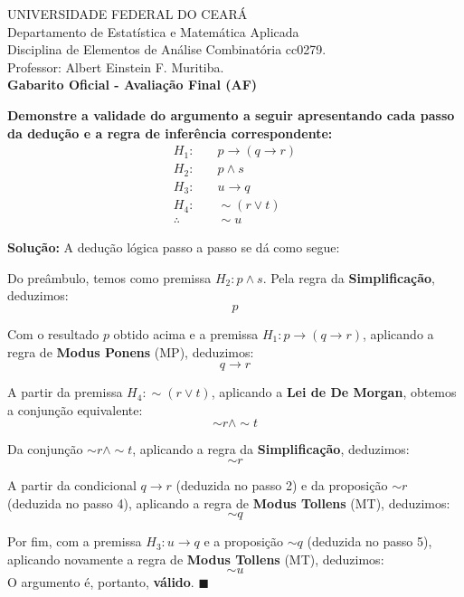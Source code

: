 \documentclass[a4paper,10pt,landscape,twocolumn]{article}  %
\let\oldenumerate\enumerate
\let\oldendenumerate\endenumerate
\renewenvironment{enumerate}{%
  \oldenumerate%
  \setlength{\itemsep}{1pt}%
  \setlength{\parskip}{0pt}%
  \setlength{\parsep}{0pt}%
  \setlength{\topsep}{2pt}%
  \setlength{\partopsep}{0pt}%
}{%
  \oldendenumerate%
}
\begin{document}
\footnotesize
\thispagestyle{empty}

UNIVERSIDADE FEDERAL DO CEARÁ\\
Departamento de Estatística e Matemática Aplicada\\
Disciplina de Elementos de Análise Combinatória cc0279.\\
Professor: Albert Einstein F. Muritiba.\\
\textbf{Gabarito Oficial - Avaliação Final (AF)} \\[0.2cm]

\begin{enumerate}
    
    \item \textbf{Demonstre a validade do argumento a seguir apresentando cada passo da dedução e a regra de inferência correspondente:}
    \begin{align*}
        H_1: & \quad p \rightarrow (q \rightarrow r) \\
        H_2: & \quad p \land s \\
        H_3: & \quad u \rightarrow q \\
        H_4: & \quad \sim(r \lor t) \\
        \hline
        \therefore & \quad \sim u
    \end{align*}
    
    \textbf{Solução:}
    A dedução lógica passo a passo se dá como segue:
    \begin{enumerate}
        \item Do preâmbulo, temos como premissa $H_2: p \land s$. Pela regra da \textbf{Simplificação}, deduzimos:
        \[ p \]
        \item Com o resultado $p$ obtido acima e a premissa $H_1: p \rightarrow (q \rightarrow r)$, aplicando a regra de \textbf{Modus Ponens} (MP), deduzimos:
        \[ q \rightarrow r \]
        \item A partir da premissa $H_4: \sim(r \lor t)$, aplicando a \textbf{Lei de De Morgan}, obtemos a conjunção equivalente:
        \[ \sim r \land \sim t \]
        \item Da conjunção $\sim r \land \sim t$, aplicando a regra da \textbf{Simplificação}, deduzimos:
        \[ \sim r \]
        \item A partir da condicional $q \rightarrow r$ (deduzida no passo 2) e da proposição $\sim r$ (deduzida no passo 4), aplicando a regra de \textbf{Modus Tollens} (MT), deduzimos:
        \[ \sim q \]
        \item Por fim, com a premissa $H_3: u \rightarrow q$ e a proposição $\sim q$ (deduzida no passo 5), aplicando novamente a regra de \textbf{Modus Tollens} (MT), deduzimos:
        \[ \sim u \]
    \end{enumerate}
    O argumento é, portanto, \textbf{válido}. \hfill $\blacksquare$


\end{enumerate}
\end{document}
